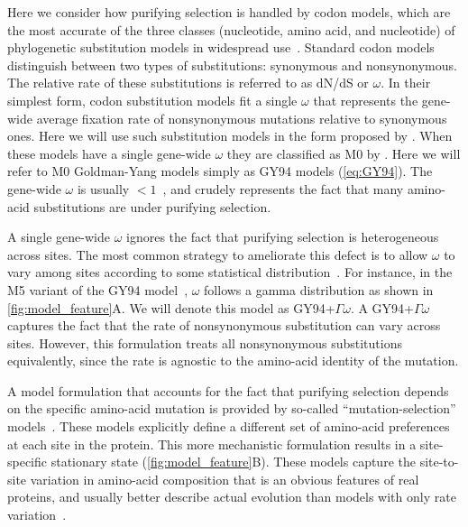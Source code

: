 \documentclass[11pt]{article}
\begin{document}
Here we consider how purifying selection is handled by codon models, which are the most accurate of the three classes (nucleotide, amino acid, and nucleotide) of phylogenetic substitution models in widespread use~\citep{arenas2015trends}.
Standard codon models distinguish between two types of substitutions: synonymous and nonsynonymous.
The relative rate of these substitutions is referred to as dN/dS or $\omega$.
In their simplest form, codon substitution models fit a single $\omega$ that represents the gene-wide average fixation rate of nonsynonymous mutations relative to synonymous ones.
Here we will use such substitution models in the form proposed by \citet{goldman1994codon}.
When these models have a single gene-wide $\omega$ they are classified as M0 by \citet{yang2000codon}.
Here we will refer to M0 Goldman-Yang models simply as GY94 models (\ref{eq:GY94}). 
The gene-wide $\omega$ is usually $<1$~\citep{murrell2015gene}, and crudely represents the fact that many amino-acid substitutions are under purifying selection.

A single gene-wide $\omega$ ignores the fact that purifying selection is heterogeneous across sites.
The most common strategy to ameliorate this defect is to allow $\omega$ to vary among sites according to some statistical distribution~\citep{yang1994maximum,yang2000codon}.
For instance, in the M5 variant of the GY94 model~\citep{yang2000codon}, $\omega$ follows a gamma distribution as shown in \ref{fig:model_feature}A.
We will denote this model as GY94+$\Gamma\omega$.
A GY94+$\Gamma\omega$ captures the fact that the rate of nonsynonymous substitution can vary across sites. 
However, this formulation treats all nonsynonymous substitutions equivalently, since the rate is agnostic to the amino-acid identity of the mutation. 

A model formulation that accounts for the fact that purifying selection depends on the specific amino-acid mutation is provided by so-called ``mutation-selection'' models~\citep{halpern1998evolutionary,yang2008mutation,rodrigue2010mutation,tamuri2012estimating,mccandlish2014modeling}.
These models explicitly define a different set of amino-acid preferences at each site in the protein. 
This more mechanistic formulation results in a site-specific stationary state (\ref{fig:model_feature}B). 
These models capture the site-to-site variation in amino-acid composition that is an obvious features of real proteins, and usually better describe actual evolution than models with only rate variation~\citep{lartillot2004bayesian, le2008phylogenetic, rodrigue2010mutation,hilton2017phydms,bloom2014experimentally}.
\end{document}
